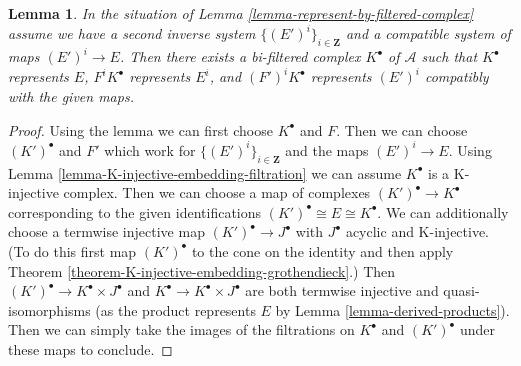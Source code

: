 \documentclass[10pt,a4paper]{amsart}
\theoremstyle{plain}
\newtheorem{lemma}[subsection]{Lemma}
\theoremstyle{definition}
\theoremstyle{remark}
\numberwithin{equation}{subsection}
\begin{document}
\begin{lemma}
\label{lemma-represent-by-filtered-complex-bis}
In the situation of Lemma \ref{lemma-represent-by-filtered-complex}
assume we have a second inverse system $\{(E')^i\}_{i \in \mathbf{Z}}$
and a compatible system of maps $(E')^i \to E$.
Then there exists a bi-filtered complex $K^\bullet$ of $\mathcal{A}$
such that $K^\bullet$ represents $E$, $F^iK^\bullet$ represents $E^i$,
and $(F')^iK^\bullet$ represents $(E')^i$ compatibly with the given maps.
\end{lemma}

\begin{proof}
Using the lemma we can first choose $K^\bullet$ and $F$.
Then we can choose $(K')^\bullet$ and $F'$ which work for
$\{(E')^i\}_{i \in \mathbf{Z}}$ and the maps $(E')^i \to E$.
Using Lemma \ref{lemma-K-injective-embedding-filtration}
we can assume $K^\bullet$ is a K-injective complex.
Then we can choose a map of complexes
$(K')^\bullet \to K^\bullet$ corresponding to
the given identifications
$(K')^\bullet \cong E \cong K^\bullet$.
We can additionally choose a termwise injective
map $(K')^\bullet \to J^\bullet$ with
$J^\bullet$ acyclic and K-injective.
(To do this first map $(K')^\bullet$ to the cone on the identity
and then apply Theorem \ref{theorem-K-injective-embedding-grothendieck}.)
Then $(K')^\bullet \to K^\bullet \times J^\bullet$ and
$K^\bullet \to K^\bullet \times J^\bullet$
are both termwise injective and quasi-isomorphisms
(as the product represents $E$ by Lemma \ref{lemma-derived-products}).
Then we can simply take the images of the filtrations
on $K^\bullet$ and $(K')^\bullet$ under these maps to conclude.
\end{proof}
\end{document}
